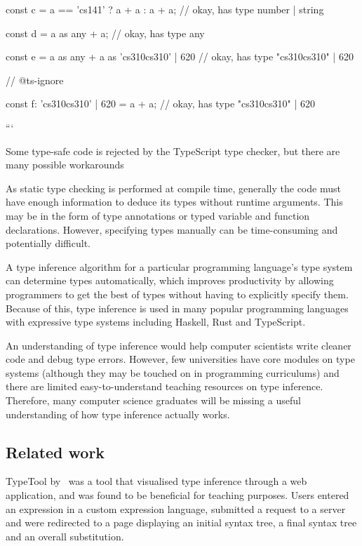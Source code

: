 \documentclass[a4paper,fleqn,12pt]{article}
\begin{document}
const c = a == 'cs141' ? a + a : a + a; // okay, has type number | string

const d = a as any + a; // okay, has type any

const e = a as any + a as 'cs310cs310' | 620 // okay, has type "cs310cs310" | 620

// @ts-ignore

const f: 'cs310cs310' | 620 = a + a; // okay, has type "cs310cs310" | 620

```

Some type-safe code is rejected by the TypeScript type checker, but there are many possible workarounds

As static type checking is performed at compile time, generally the code must have enough information to deduce its types without runtime arguments. This may be in the form of type annotations or typed variable and function declarations. However, specifying types manually can be time-consuming and potentially difficult.

A type inference algorithm for a particular programming language’s type system can determine types automatically, which improves productivity by allowing programmers to get the best of types without having to explicitly specify them. Because of this, type inference is used in many popular programming languages with expressive type systems including Haskell, Rust and TypeScript.

An understanding of type inference would help computer scientists write cleaner code and debug type errors. However, few universities have core modules on type systems (although they may be touched on in programming curriculums) and there are limited easy-to-understand teaching resources on type inference. Therefore, many computer science graduates will be missing a useful understanding of how type inference actually works.

\subsection{Related work}\label{id:h.2mwaav7jkal4}

TypeTool by~\cite{ref4} was a tool that visualised type inference through a web application, and was found to be beneficial for teaching purposes. Users entered an expression in a custom expression language, submitted a request to a server and were redirected to a page displaying an initial syntax tree, a final syntax tree and an overall substitution.
\end{document}
